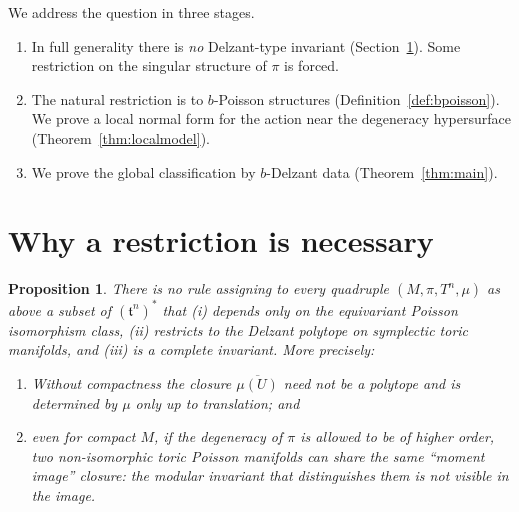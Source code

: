 \documentclass{amsart}
\newtheorem{proposition}{Proposition}
\theoremstyle{definition}
\begin{document}
We address the question in three stages.
\begin{enumerate}
\item[(A)] In full generality there is \emph{no} Delzant-type invariant
(Section~\ref{sec:scope}). Some restriction on the singular structure of $\pi$
is forced.
\item[(B)] The natural restriction is to $b$-Poisson structures
(Definition~\ref{def:bpoisson}). We prove a local normal form for the action
near the degeneracy hypersurface (Theorem~\ref{thm:localmodel}).
\item[(C)] We prove the global classification by $b$-Delzant data
(Theorem~\ref{thm:main}).
\end{enumerate}

\section{Why a restriction is necessary}\label{sec:scope}

\begin{proposition}\label{prop:noinvariant}
There is no rule assigning to every quadruple $(M,\pi,T^n,\mu)$ as above a
subset of $(\mathfrak t^n)^*$ that (i) depends only on the equivariant Poisson
isomorphism class, (ii) restricts to the Delzant polytope on symplectic toric
manifolds, and (iii) is a complete invariant. More precisely:
\begin{enumerate}
\item Without compactness the closure $\overline{\mu(U)}$ need not be a polytope
and is determined by $\mu$ only up to translation; and
\item even for \emph{compact} $M$, if the degeneracy of $\pi$ is allowed to be
of higher order, two non-isomorphic toric Poisson manifolds can share the same
``moment image'' closure: the modular invariant that distinguishes them is not
visible in the image.
\end{enumerate}
\end{proposition}
\end{document}
